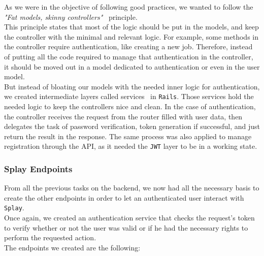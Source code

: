 \documentclass{eplmastersthesis}
\begin{document}
          As we were in the objective of following good practices, we wanted
          to follow the \textit{"Fat models, skinny controllers"}~\cite{fatski}
          principle.\\
          This principle states that most of the logic should be put in the
          models, and keep the controller with the minimal and relevant logic.
          For example, some methods in the controller require authentication,
          like creating a new job. Therefore, instead of putting all the code
          required to manage that authentication in the controller, it should
          be moved out in a model dedicated to authentication or even in
          the user model.\\

          But instead of bloating our models with the needed inner logic for
          authentication, we created intermediate layers called services~\cite{fatmod}
          in \texttt{Rails}. Those services hold the needed logic to keep the controllers
          nice and clean. In the case of authentication, the controller receives
          the request from the router filled with user data, then delegates
          the task of password verification, token generation if successful,
          and just return the result in the response. The same process was also
          applied to manage registration through the API, as it needed the \texttt{JWT}
          layer to be in a working state.

        \subsubsection{Splay Endpoints}

          From all the previous tasks on the backend, we now had all the
          necessary basis to create the other endpoints in order to let
          an authenticated user interact with \texttt{Splay}.\\

          Once again, we created an authentication service that checks
          the request's token to verify whether or not the user was valid or
          if he had the necessary rights to perform the requested action.\\

          The endpoints we created are the following:
\end{document}
